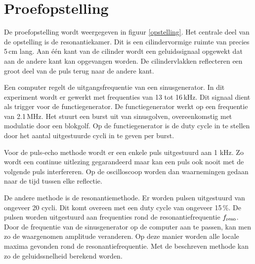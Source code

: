 \section{Proefopstelling}


De proefopstelling wordt weergegeven in figuur \ref{opstelling}. Het centrale 
deel van de opstelling is de resonantiekamer. Dit is een cilindervormige ruimte 
van precies 5\,cm lang. Aan \'e\'en kant van de cilinder wordt een 
geluidssignaal opgewekt dat aan de andere kant kan opgevangen worden. De 
cilindervlakken reflecteren een groot deel van de puls terug naar de andere 
kant. 

Een computer regelt de uitgangsfrequentie van een sinusgenerator. In dit 
experiment wordt er gewerkt met frequenties van 13 tot 16\,kHz. Dit signaal 
dient als trigger voor de functiegenerator. De functiegenerator werkt op een 
frequentie van 2.1\,MHz. Het stuurt een burst uit van sinusgolven, 
overeenkomstig met modulatie door een blokgolf. Op de functiegenerator is de 
duty cycle in te stellen door het aantal uitgestuurde cycli in te geven per 
burst.

Voor de puls-echo methode wordt er een enkele puls uitgestuurd aan 1 kHz. Zo 
wordt een continue uitlezing gegarandeerd maar kan een puls ook nooit met de 
volgende puls interfereren. Op de oscilloscoop worden dan waarnemingen gedaan 
naar de tijd tussen elke reflectie.

De andere methode is de resonantiemethode. Er worden pulsen uitgestuurd van 
ongeveer 20 cycli. Dit komt overeen met een duty cycle van ongeveer 15\,\%.  De 
pulsen worden uitgestuurd aan frequenties rond de resonantiefrequentie 
$f_\mathrm{reso}$.  Door de frequentie van de sinusgenerator op de computer aan te 
passen, kan men zo de waargenomen amplitude veranderen. Op deze manier worden 
alle locale maxima gevonden rond de resonantiefrequentie. Met de beschreven 
methode kan zo de geluidssnelheid berekend worden. 
